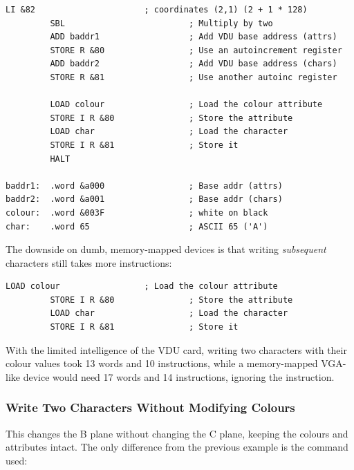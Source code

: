 \begin{lstlisting}[language=cftasm]
         LI &82                      ; coordinates (2,1) (2 + 1 * 128)
         SBL                         ; Multiply by two
         ADD baddr1                  ; Add VDU base address (attrs)
         STORE R &80                 ; Use an autoincrement register
         ADD baddr2                  ; Add VDU base address (chars)
         STORE R &81                 ; Use another autoinc register

         LOAD colour                 ; Load the colour attribute
         STORE I R &80               ; Store the attribute
         LOAD char                   ; Load the character
         STORE I R &81               ; Store it
         HALT

baddr1:  .word &a000                 ; Base addr (attrs)
baddr2:  .word &a001                 ; Base addr (chars)
colour:  .word &003F                 ; white on black
char:    .word 65                    ; ASCII 65 ('A')
\end{lstlisting}

\noindent The downside on dumb, memory-mapped devices is that writing {\em subsequent\/}
characters still takes more instructions:

\begin{lstlisting}[language=cftasm]
         LOAD colour                 ; Load the colour attribute
         STORE I R &80               ; Store the attribute
         LOAD char                   ; Load the character
         STORE I R &81               ; Store it
\end{lstlisting}

\noindent With the limited intelligence of the VDU card, writing two characters
with their colour values took 13 words and 10 instructions, while a
memory-mapped VGA-like device would need 17 words and 14 instructions, ignoring
the  instruction.



\subsubsection{Write Two Characters Without Modifying Colours}

This changes the B plane without changing the C plane, keeping the colours and
attributes intact. The only difference from the previous example is the command
used:

